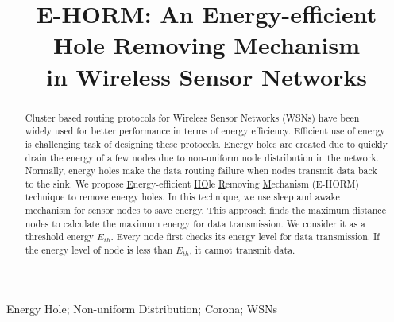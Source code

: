 \documentclass{article}
\title{E-HORM: An Energy-efficient Hole Removing Mechanism\\ in Wireless Sensor Networks}
\begin{document}
\maketitle
\begin{abstract}
Cluster based routing protocols for Wireless Sensor Networks (WSNs) have been widely used for better performance in terms of energy efficiency.
Efficient use of energy is challenging task of designing these protocols. Energy holes are created due to quickly drain the energy of a few nodes due to non-uniform node distribution in the network. Normally, energy holes make the data routing failure when nodes transmit data back to the sink. We propose \underline{E}nergy-efficient \underline{HO}le \underline{R}emoving \underline{M}echanism (E-HORM) technique to remove energy holes. In this technique, we use sleep and awake mechanism for sensor nodes to save energy. This approach finds the maximum distance nodes to calculate the maximum energy for data transmission. We consider it as a threshold energy $E_{th}$. Every node first checks its energy level for data transmission. If the energy level of node is less than $E_{th}$, it cannot transmit data. 
\end{abstract}
\begin{keywords}
Energy Hole; Non-uniform Distribution; Corona; WSNs
\end{keywords}
\end{document}
